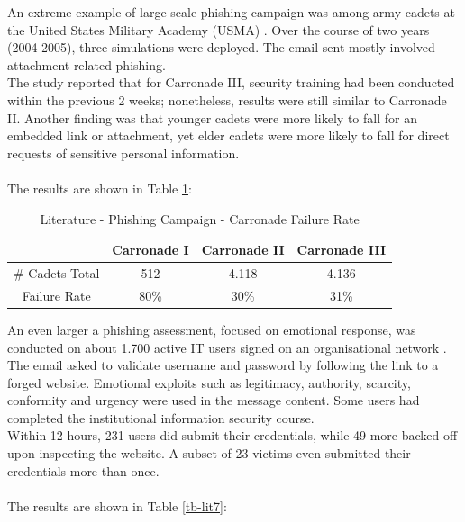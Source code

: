 \documentclass[a4paper]{article}
\begin{document}
\noindent
An extreme example of large scale phishing campaign was among army cadets at the United States Military Academy (USMA) \cite{lit-casestudy-carronade-academy}. Over the course of two years (2004-2005), three simulations were deployed. The email sent mostly involved attachment-related phishing.
\\
The study reported that for Carronade III, security training had been conducted within the previous 2 weeks; nonetheless, results were still similar to Carronade II. Another finding was that younger cadets were more likely to fall for an embedded link or attachment, yet elder cadets were more likely to fall for direct requests of sensitive personal information.
\\ \\
The results are shown in Table \ref{tb-lit6}:

\smallskip

\begingroup
\renewcommand{\arraystretch}{1.25}
\begin{table}[ht]
\begin{center}
    \begin{tabular}{ | c | c | c | c | }
    \hline
    & \textbf{Carronade I} & \textbf{Carronade II} & \textbf{Carronade III} \\ \hline
    \# Cadets Total & 512 & 4.118 & 4.136 \\ \hline
    Failure Rate & 80\% & 30\% & 31\% \\ \hline
    \end{tabular}
\end{center}
\caption{Literature - Phishing Campaign - Carronade Failure Rate \cite{lit-casestudy-carronade-academy}}
\label{tb-lit6}
\end{table}
\endgroup

\newpage

\noindent
An even larger a phishing assessment, focused on emotional response, was conducted on about 1.700 active IT users signed on an organisational network \cite{lit-casestudy-organisational-learning}. The email asked to validate username and password by following the link to a forged website. Emotional exploits such as legitimacy, authority, scarcity, conformity and urgency were used in the message content. Some users had completed the institutional information security course.
\\
Within 12 hours, 231 users did submit their credentials, while 49 more backed off upon inspecting the website. A subset of 23 victims even submitted their credentials more than once.
\\ \\
The results are shown in Table \ref{tb-lit7}:
\end{document}
